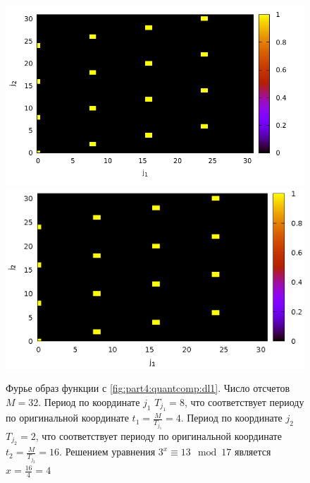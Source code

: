 \begin{figure}
\centering

\ifpdf
\includegraphics[angle=0]
{./part4/quantcomp/picdiscretlog2.pdf}
\else
\includegraphics[angle=0]
{./part4/quantcomp/picdiscretlog2.eps}
\fi

%

\caption{Фурье образ функции с \autoref{fig:part4:quantcomp:dl1}.
  Число отсчетов $M=32$. Период по координате $j_1$ $T_{j_1} = 8$, что
соответствует периоду по оригинальной координате $t_1 =
\frac{M}{T_{j_1}} = 4$. Период по координате $j_2$ $T_{j_2} = 2$, что
соответствует периоду по оригинальной координате $t_2 =
\frac{M}{T_{j_2}} = 16$. Решением уравнения $3^x \equiv 13 \mod 17$
является $x = \frac{16}{4} = 4$} 
\label{fig:part4:quantcomp:dl2}
\end{figure}

